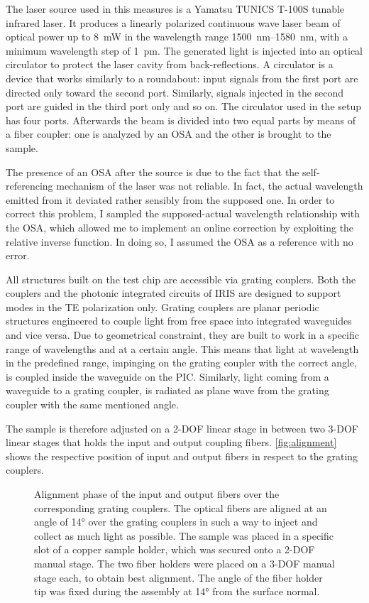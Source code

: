 The laser source used in this measures is a Yamatsu TUNICS T-100S tunable infrared laser.
It produces a linearly polarized continuous wave laser beam of optical power up to \SI{8}{\mW} in the wavelength range \SIrange{1500}{1580}{\nm}, with a minimum wavelength step of \SI{1}{\pm}.
The generated light is injected into an optical circulator to protect the laser cavity from back-reflections.
A circulator is a device that works similarly to a roundabout: input signals from the first port are directed only toward the second port. Similarly, signals injected in the second port are guided in the third port only and so on.
The circulator used in the setup has four ports.
Afterwards the beam is divided into two equal parts by means of a fiber coupler: one is analyzed by an \acf{OSA} and the other is brought to the sample.

The presence of an \ac{OSA} after the source is due to the fact that the self-referencing mechanism of the laser was not reliable.
In fact, the actual wavelength emitted from it deviated rather sensibly from the supposed one.
In order to correct this problem, I sampled the supposed-actual wavelength relationship with the \ac{OSA}, which allowed me to implement an online correction by exploiting the relative inverse function.
In doing so, I assumed the \ac{OSA} as a reference with no error.

All structures built on the test chip are accessible via grating couplers.
Both the couplers and the photonic integrated circuits of IRIS are designed to support modes in the \acs{TE} polarization only.
Grating couplers are planar periodic structures engineered to couple light from free space into integrated waveguides and vice versa.
Due to geometrical constraint, they are built to work in a specific range of wavelengths and at a certain angle.
This means that light at wavelength in the predefined range, impinging on the grating coupler with the correct angle, is coupled inside the waveguide on the \ac{PIC}.
Similarly, light coming from a waveguide to a grating coupler, is radiated as plane wave from the grating coupler with the same mentioned angle.

The sample is therefore adjusted on a 2-\acs{DOF} linear stage in between two 3-\acs{DOF} linear stages that holds the input and output coupling fibers.
\autoref{fig:alignment} shows the respective position of input and output fibers in respect to the grating couplers.

\begin{figure}[htbp]
	\centering
	
	\caption{Alignment phase of the input and output fibers over the corresponding grating couplers.
	The optical fibers are aligned at an angle of \ang{14} over the grating couplers in such a way to inject and collect as much light as possible.
	The sample was placed in a specific slot of a copper sample holder, which was secured onto a 2-\acs{DOF} manual stage.
	The two fiber holders were placed on a 3-\acs{DOF} manual stage each, to obtain best alignment.
	The angle of the fiber holder tip was fixed during the assembly at \ang{14} from the surface normal.}
	\label{fig:alignment}
\end{figure}

